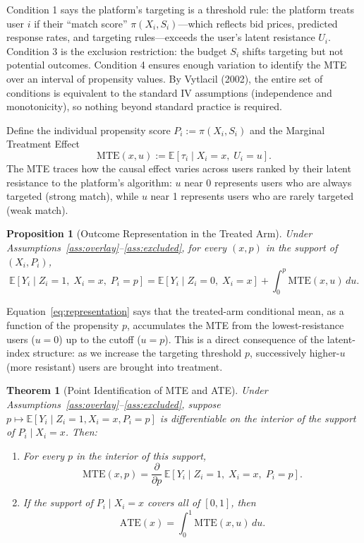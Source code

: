 \documentclass[12pt]{article}
\newtheorem{proposition}{Proposition}
\newtheorem{theorem}{Theorem}
\newcommand{\E}{\mathbb{E}}
\newcommand{\ATE}{\mathrm{ATE}}
\newcommand{\MTE}{\mathrm{MTE}}
\begin{document}
Condition 1 says the platform's targeting is a threshold rule: the platform
treats user $i$ if their ``match score'' $\pi(X_i, S_i)$---which reflects
bid prices, predicted response rates, and targeting rules---exceeds the
user's latent resistance $U_i$. Condition 3 is the exclusion restriction:
the budget $S_i$ shifts targeting but not potential outcomes. Condition 4
ensures enough variation to identify the MTE over an interval of propensity
values. By Vytlacil (2002), the entire set of conditions is equivalent to
the standard IV assumptions (independence and monotonicity), so nothing
beyond standard practice is required.

Define the individual propensity score $P_i := \pi(X_i, S_i)$ and the
Marginal Treatment Effect
\[
  \MTE(x, u) := \E[\tau_i \mid X_i = x,\; U_i = u].
\]
The MTE traces how the causal effect varies across users ranked by their
latent resistance to the platform's algorithm: $u$ near 0 represents users
who are always targeted (strong match), while $u$ near 1 represents users
who are rarely targeted (weak match).

\begin{proposition}[Outcome Representation in the Treated Arm]
\label{prop:representation}
Under Assumptions~\ref{ass:overlay}--\ref{ass:excluded}, for every
$(x, p)$ in the support of $(X_i, P_i)$,
\begin{equation}
  \E[Y_i \mid Z_i = 1,\; X_i = x,\; P_i = p]
  = \E[Y_i \mid Z_i = 0,\; X_i = x]
  + \int_0^p \MTE(x, u)\, du.
  \label{eq:representation}
\end{equation}
\end{proposition}

Equation~\eqref{eq:representation} says that the treated-arm conditional
mean, as a function of the propensity $p$, accumulates the MTE from the
lowest-resistance users ($u = 0$) up to the cutoff ($u = p$). This is a
direct consequence of the latent-index structure: as we increase the
targeting threshold $p$, successively higher-$u$ (more resistant) users
are brought into treatment.

\begin{theorem}[Point Identification of MTE and ATE]
\label{thm:pointid}
Under Assumptions~\ref{ass:overlay}--\ref{ass:excluded}, suppose
$p \mapsto \E[Y_i \mid Z_i = 1, X_i = x, P_i = p]$ is differentiable
on the interior of the support of $P_i \mid X_i = x$. Then:
\begin{enumerate}
  \item For every $p$ in the interior of this support,
        \begin{equation}
          \MTE(x, p) = \frac{\partial}{\partial p}\,
          \E[Y_i \mid Z_i = 1,\; X_i = x,\; P_i = p].
          \label{eq:mte}
        \end{equation}
  \item If the support of $P_i \mid X_i = x$ covers all of $[0,1]$, then
        \begin{equation}
          \ATE(x) = \int_0^1 \MTE(x, u)\, du.
          \label{eq:ate_full}
        \end{equation}
\end{enumerate}
\end{theorem}
\end{document}
